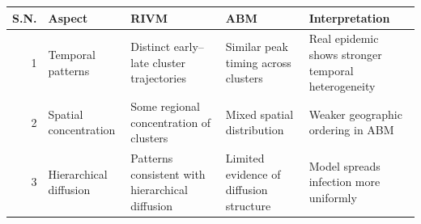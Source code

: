 \begin{tabular}{rllll}
\toprule
S.N. & Aspect & RIVM & ABM & Interpretation \\
\midrule
1 & Temporal patterns & Distinct early–late cluster trajectories & Similar peak timing across clusters & Real epidemic shows stronger temporal heterogeneity \\
2 & Spatial concentration & Some regional concentration of clusters & Mixed spatial distribution & Weaker geographic ordering in ABM \\
3 & Hierarchical diffusion & Patterns consistent with hierarchical diffusion & Limited evidence of diffusion structure & Model spreads infection more uniformly \\
\bottomrule
\end{tabular}
